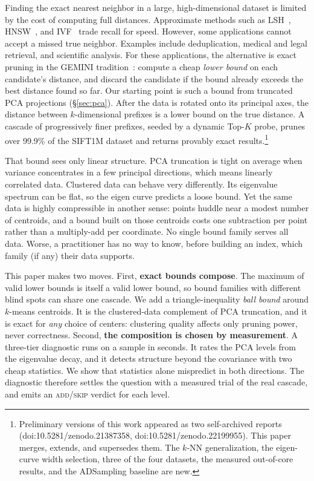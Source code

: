 \documentclass[sigconf, nonacm]{acmart}
\begin{document}
Finding the exact nearest neighbor in a large, high-dimensional dataset is
limited by the cost of computing full distances. Approximate methods such
as LSH~\cite{lsh}, HNSW~\cite{hnsw}, and IVF~\cite{faiss} trade recall for
speed. However, some applications cannot accept a missed true neighbor.
Examples include deduplication, medical and legal retrieval, and
scientific analysis. For these applications, the alternative is exact
pruning in the GEMINI tradition~\cite{gemini}: compute a cheap \emph{lower
bound} on each candidate's distance, and discard the candidate if the
bound already exceeds the best distance found so far. Our starting point
is such a bound from truncated PCA projections (\S\ref{sec:pca}). After
the data is rotated onto its principal axes, the distance between
$k$-dimensional prefixes is a lower bound on the true distance. A cascade
of progressively finer prefixes, seeded by a dynamic Top-$K$ probe, prunes
over 99.9\% of the SIFT1M dataset and returns provably exact
results.\footnote{Preliminary versions of this work appeared as two
self-archived reports (doi:10.5281/zenodo.21387358,
doi:10.5281/zenodo.22199955). This paper merges, extends, and supersedes
them. The $k$-NN generalization, the eigen-curve width selection, three of
the four datasets, the measured out-of-core results, and the ADSampling
baseline are new.}

That bound sees only linear structure. PCA truncation is tight on average
when variance concentrates in a few principal directions, which means
linearly correlated data. Clustered data can behave very differently. Its
eigenvalue spectrum can be flat, so the eigen curve predicts a loose
bound. Yet the same data is highly compressible in another sense: points
huddle near a modest number of centroids, and a bound built on those
centroids costs one subtraction per point rather than a multiply-add per
coordinate. No single bound family serves all data. Worse, a practitioner has no way to know, before building
an index, which family (if any) their data supports.

This paper makes two moves. First, \textbf{exact bounds compose}. The
maximum of valid lower bounds is itself a valid lower bound, so bound
families with different blind spots can share one cascade. We add a
triangle-inequality \emph{ball bound} around $k$-means centroids. It is
the clustered-data complement of PCA truncation, and it is exact for
\emph{any} choice of centers: clustering quality affects only pruning
power, never correctness. Second, \textbf{the composition is chosen by
measurement}. A three-tier diagnostic runs on a sample in seconds. It
rates the PCA levels from the eigenvalue decay, and it detects structure
beyond the covariance with two cheap statistics. We show that statistics
alone mispredict in both directions. The diagnostic therefore settles the
question with a measured trial of the real cascade, and emits an
\textsc{add}/\textsc{skip} verdict for each level.
\end{document}
